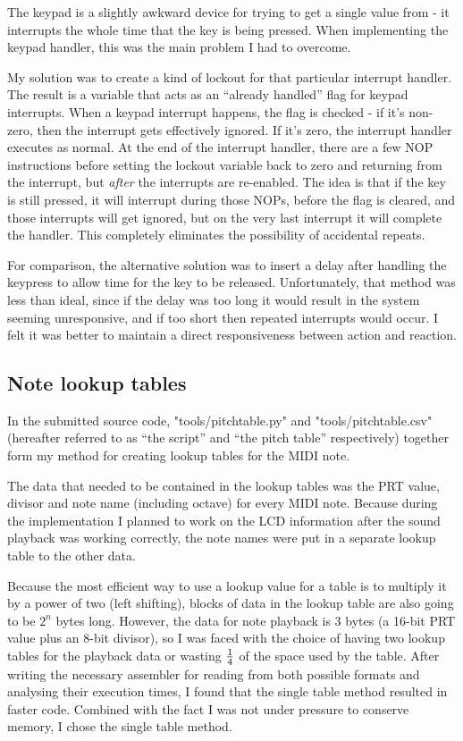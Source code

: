 \documentclass[a4paper,10pt]{article}
\begin{document}
The keypad is a slightly awkward device for trying to get a single value from - it interrupts the 
whole time that the key is being pressed.  When implementing the keypad handler, this was the main 
problem I had to overcome.

My solution was to create a kind of lockout for that particular interrupt handler.  The result is a 
variable that acts as an ``already handled'' flag for keypad interrupts.  When a keypad interrupt 
happens, the flag is checked - if it's non-zero, then the interrupt gets effectively ignored.  If 
it's zero, the interrupt handler executes as normal.  At the end of the interrupt handler, there are 
a few NOP instructions before setting the lockout variable back to zero and returning from the 
interrupt, but \emph{after} the interrupts are re-enabled.  The idea is that if the key is still 
pressed, it will interrupt during those NOPs, before the flag is cleared, and those interrupts will 
get ignored, but on the very last interrupt it will complete the handler.  This completely 
eliminates the possibility of accidental repeats.

For comparison, the alternative solution was to insert a delay after handling the keypress to allow 
time for the key to be released.  Unfortunately, that method was less than ideal, since if the delay 
was too long it would result in the system seeming unresponsive, and if too short then repeated 
interrupts would occur.  I felt it was better to maintain a direct responsiveness between action and 
reaction.

\subsection{Note lookup tables}
\label{notelookuptables}

In the submitted source code, "tools/pitchtable.py" and "tools/pitchtable.csv" (hereafter referred 
to as ``the script'' and ``the pitch table'' respectively) together form my method for creating 
lookup tables for the MIDI note.

The data that needed to be contained in the lookup tables was the PRT value, divisor and note name 
(including octave) for every MIDI note.  Because during the implementation I planned to work on the 
LCD information after the sound playback was working correctly, the note names were put in a 
separate lookup table to the other data.

Because the most efficient way to use a lookup value for a table is to multiply it by a power of two 
(left shifting), blocks of data in the lookup table are also going to be $2^n$ bytes long.  However, 
the data for note playback is 3 bytes (a 16-bit PRT value plus an 8-bit divisor), so I was faced 
with the choice of having two lookup tables for the playback data or wasting $1\over4$ of the space 
used by the table.  After writing the necessary assembler for reading from both possible formats and 
analysing their execution times, I found that the single table method resulted in faster code.  
Combined with the fact I was not under pressure to conserve memory, I chose the single table method.
\end{document}
